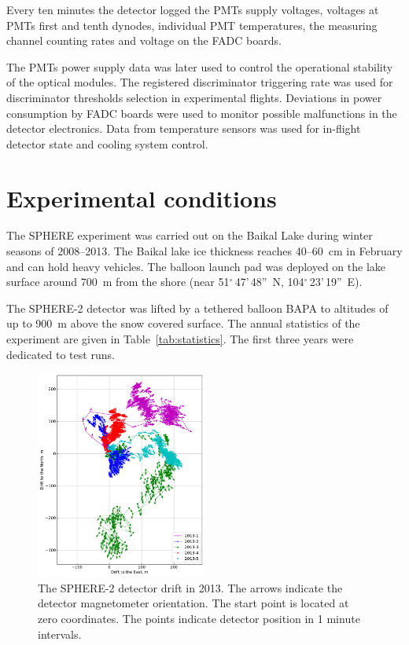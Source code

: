 \documentclass[universe,article,submit,moreauthors,pdftex]{Definitions/mdpi}
\begin{document}
Every ten minutes the detector logged the PMTs supply voltages, voltages at PMTs first and tenth dynodes, individual PMT temperatures, the measuring channel counting rates and voltage on the FADC boards.

The PMTs power supply data was later used to control the operational stability of the optical modules. The registered discriminator triggering rate was used for discriminator thresholds selection in experimental flights. Deviations in power consumption by FADC boards were used to monitor possible malfunctions in the detector electronics. Data from temperature sensors was used for in-flight detector state and cooling system control.





\section{Experimental conditions}
\label{sect:data}
 
The SPHERE experiment was carried out on the Baikal Lake during winter seasons of 2008--2013. The Baikal lake ice thickness reaches 40--60~cm in February and can hold heavy vehicles. The balloon launch pad was deployed on the lake surface around 700~m from the shore (near 51$^\circ$\,47'\,48''~N, 104$^\circ$\,23'\,19''~E).

The \mbox{SPHERE-2} detector was lifted by a tethered balloon BAPA to altitudes of up to 900~m above the snow covered surface. The annual statistics of the experiment are given in Table~\ref{tab:statistics}. The first three years were dedicated to test runs. 

\begin{figure}[tb]
    \includegraphics[width=0.5\textwidth]{figs/fig4_GPS_drift.pdf}\hspace{2pc}%
    \caption{The SPHERE-2 detector drift in 2013. The arrows indicate the detector magnetometer orientation. The start point is located at zero coordinates. The points indicate detector position in 1 minute intervals.}
\label{fig:gps_compass}
\end{figure}
\end{document}
